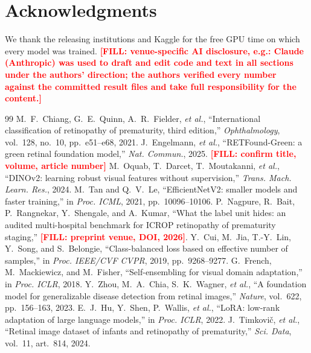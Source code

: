 \documentclass[conference]{IEEEtran}
\newcommand{\FILL}[1]{\textcolor{red}{\textbf{[FILL: #1]}}}
\begin{document}
\section*{Acknowledgments}
We thank the releasing institutions and Kaggle for the free GPU time on which every model was trained. \FILL{venue-specific AI disclosure, e.g.: Claude (Anthropic) was used to draft and edit code and text in all sections under the authors' direction; the authors verified every number against the committed result files and take full responsibility for the content.}

\begin{thebibliography}{99}
 M.~F.~Chiang, G.~E.~Quinn, A.~R.~Fielder, \emph{et al.}, ``International classification of retinopathy of prematurity, third edition,'' \emph{Ophthalmology}, vol.~128, no.~10, pp.~e51--e68, 2021.
 J.~Engelmann, \emph{et al.}, ``RETFound-Green: a green retinal foundation model,'' \emph{Nat. Commun.}, 2025. \FILL{confirm title, volume, article number}
 M.~Oquab, T.~Darcet, T.~Moutakanni, \emph{et al.}, ``DINOv2: learning robust visual features without supervision,'' \emph{Trans. Mach. Learn. Res.}, 2024.
 M.~Tan and Q.~V.~Le, ``EfficientNetV2: smaller models and faster training,'' in \emph{Proc. ICML}, 2021, pp.~10096--10106.
 P.~Nagpure, R.~Bait, P.~Rangnekar, Y.~Shengale, and A.~Kumar, ``What the label unit hides: an audited multi-hospital benchmark for ICROP retinopathy of prematurity staging,'' \FILL{preprint venue, DOI, 2026}.
 Y.~Cui, M.~Jia, T.-Y.~Lin, Y.~Song, and S.~Belongie, ``Class-balanced loss based on effective number of samples,'' in \emph{Proc. IEEE/CVF CVPR}, 2019, pp.~9268--9277.
 G.~French, M.~Mackiewicz, and M.~Fisher, ``Self-ensembling for visual domain adaptation,'' in \emph{Proc. ICLR}, 2018.
 Y.~Zhou, M.~A.~Chia, S.~K.~Wagner, \emph{et al.}, ``A foundation model for generalizable disease detection from retinal images,'' \emph{Nature}, vol.~622, pp.~156--163, 2023.
 E.~J.~Hu, Y.~Shen, P.~Wallis, \emph{et al.}, ``LoRA: low-rank adaptation of large language models,'' in \emph{Proc. ICLR}, 2022.
 J.~Timkovi\v{c}, \emph{et al.}, ``Retinal image dataset of infants and retinopathy of prematurity,'' \emph{Sci. Data}, vol.~11, art.~814, 2024.
\end{thebibliography}
\end{document}
